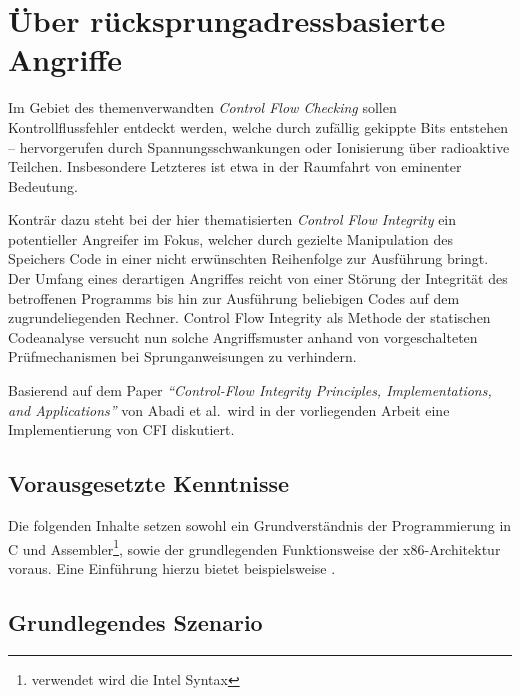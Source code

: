 


\renewcommand{\refname}{Literaturverzeichnis}
\maketitle%

\section{Über rücksprungadressbasierte Angriffe}
\label{sec:ret_attack}
Im Gebiet des themenverwandten \emph{Control Flow Checking} sollen Kontrollflussfehler entdeckt werden, welche durch zufällig gekippte Bits entstehen -- hervorgerufen durch Spannungsschwankungen oder Ionisierung über radioaktive Teilchen. Insbesondere Letzteres ist etwa in der Raumfahrt von eminenter Bedeutung.

Konträr dazu steht bei der hier thematisierten \emph{Control Flow Integrity} ein potentieller Angreifer im Fokus, welcher durch gezielte Manipulation des Speichers Code in einer nicht erwünschten Reihenfolge zur Ausführung bringt. Der Umfang eines derartigen Angriffes reicht von einer Störung der Integrität des betroffenen Programms bis hin zur Ausführung beliebigen Codes auf dem zugrundeliegenden Rechner. Control Flow Integrity als Methode der statischen Codeanalyse versucht nun solche Angriffsmuster anhand von vorgeschalteten Prüfmechanismen bei Sprunganweisungen zu verhindern.

Basierend auf dem Paper \emph{\enquote{Control-Flow Integrity Principles, Implementations, and Applications}} von Abadi et al.\,\cite{Abadi.2009} wird in der vorliegenden Arbeit eine Implementierung von CFI diskutiert.

\subsection{Vorausgesetzte Kenntnisse}

Die folgenden Inhalte setzen sowohl ein Grundverständnis der Programmierung in C und Assembler\footnote{verwendet wird die Intel Syntax}, sowie der grundlegenden Funktionsweise der x86-Architektur voraus. Eine Einführung hierzu bietet beispielsweise \cite[S.7-91]{Erickson.2009}.

\subsection{Grundlegendes Szenario}


